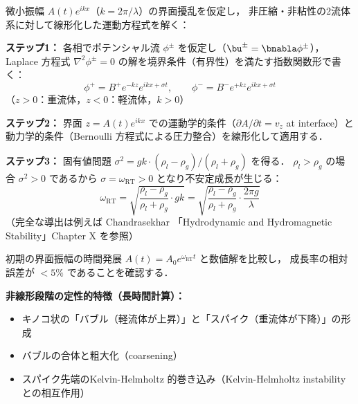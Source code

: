 \begin{tcolorbox}[resultbox, title={線形成長率 $\omega_{\text{RT}}$ の導出（線形安定解析の概略）}]
微小振幅 $A(t) e^{ikx}$（$k = 2\pi/\lambda$）の界面擾乱を仮定し，
非圧縮・非粘性の2流体系に対して線形化した運動方程式を解く：

\textbf{ステップ1：} 各相でポテンシャル流 $\phi^\pm$ を仮定し（$\bu^\pm = \bnabla\phi^\pm$），
Laplace 方程式 $\nabla^2\phi^\pm = 0$ の解を境界条件（有界性）を満たす指数関数形で書く：
\[
  \phi^+ = B^+ e^{-kz} e^{ikx+\sigma t}, \qquad
  \phi^- = B^- e^{+kz} e^{ikx+\sigma t}
\]
（$z > 0$：重流体，$z < 0$：軽流体，$k > 0$）

\textbf{ステップ2：} 界面 $z = A(t) e^{ikx}$ での運動学的条件（$\partial A/\partial t = v_z$ at interface）と
動力学的条件（Bernoulli 方程式による圧力整合）を線形化して適用する．

\textbf{ステップ3：} 固有値問題 $\sigma^2 = gk \cdot (\rho_l - \rho_g)/(\rho_l + \rho_g)$ を得る．
$\rho_l > \rho_g$ の場合 $\sigma^2 > 0$ であるから $\sigma = \omega_{\text{RT}} > 0$ となり不安定成長が生じる：
\[
  \omega_{\text{RT}} = \sqrt{\frac{\rho_l - \rho_g}{\rho_l + \rho_g} \cdot gk}
  = \sqrt{\frac{\rho_l - \rho_g}{\rho_l + \rho_g} \cdot \frac{2\pi g}{\lambda}}
\]
（完全な導出は例えば Chandrasekhar \cite{Chandrasekhar1961}「Hydrodynamic and Hydromagnetic Stability」Chapter X を参照）
\end{tcolorbox}

初期の界面振幅の時間発展 $A(t) = A_0 e^{\omega_{\text{RT}} t}$ と数値解を比較し，
成長率の相対誤差が $< 5\%$ であることを確認する．

\textbf{非線形段階の定性的特徴（長時間計算）：}
\begin{itemize}
  \item キノコ状の「バブル（軽流体が上昇）」と「スパイク（重流体が下降）」の形成
  \item バブルの合体と粗大化（coarsening）
  \item スパイク先端のKelvin-Helmholtz 的巻き込み（Kelvin-Helmholtz instability との相互作用）
\end{itemize}

